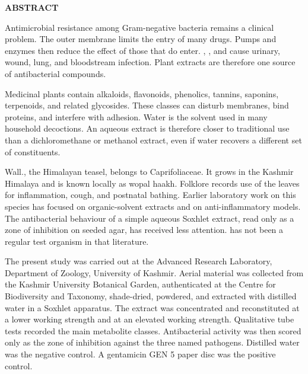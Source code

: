 
\clearpage
\thispagestyle{frontmatterstyle}
\begin{center}
{\Large \bfseries ABSTRACT\par}
\vspace{0.25in}
\end{center}

\noindent Antimicrobial resistance among Gram-negative bacteria remains a clinical problem. The outer membrane limits the entry of many drugs. Pumps and enzymes then reduce the effect of those that do enter. , , and  cause urinary, wound, lung, and bloodstream infection. Plant extracts are therefore one source of antibacterial compounds.

\noindent Medicinal plants contain alkaloids, flavonoids, phenolics, tannins, saponins, terpenoids, and related glycosides. These classes can disturb membranes, bind proteins, and interfere with adhesion. Water is the solvent used in many household decoctions. An aqueous extract is therefore closer to traditional use than a dichloromethane or methanol extract, even if water recovers a different set of constituents.

\noindent {} Wall., the Himalayan teasel, belongs to Caprifoliaceae. It grows in the Kashmir Himalaya and is known locally as wopal haakh. Folklore records use of the leaves for inflammation, cough, and postnatal bathing. Earlier laboratory work on this species has focused on organic-solvent extracts and on anti-inflammatory models. The antibacterial behaviour of a simple aqueous Soxhlet extract, read only as a zone of inhibition on seeded agar, has received less attention.  has not been a regular test organism in that literature.

\noindent The present study was carried out at the Advanced Research Laboratory, Department of Zoology, University of Kashmir. Aerial material was collected from the Kashmir University Botanical Garden, authenticated at the Centre for Biodiversity and Taxonomy, shade-dried, powdered, and extracted with distilled water in a Soxhlet apparatus. The extract was concentrated and reconstituted at a lower working strength and at an elevated working strength. Qualitative tube tests recorded the main metabolite classes. Antibacterial activity was then scored only as the zone of inhibition against the three named pathogens. Distilled water was the negative control. A gentamicin GEN 5 paper disc was the positive control.

